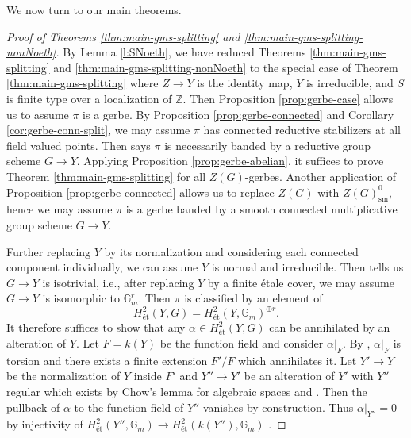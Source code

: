 \documentclass{amsart}
\theoremstyle{definition}
\newcommand{\bG}{\mathbb{G}}
\newcommand{\sm}{\mathrm{sm}}
\begin{document}
	We now turn to our main theorems.
	
	\begin{proof}[{Proof of Theorems \ref{thm:main-gms-splitting} and \ref{thm:main-gms-splitting-nonNoeth}}]
		By Lemma \ref{l:SNoeth}, we have reduced Theorems \ref{thm:main-gms-splitting} and \ref{thm:main-gms-splitting-nonNoeth} to the special case of Theorem \ref{thm:main-gms-splitting} where $Z\to Y$ is the identity map, $Y$ is irreducible, and $S$ is finite type over a localization of $\mathbb{Z}$. Then Proposition \ref{prop:gerbe-case} allows us to assume $\pi$ is a gerbe. By Proposition \ref{prop:gerbe-connected} and Corollary \ref{cor:gerbe-conn-split}, we may assume $\pi$ has connected reductive stabilizers at all field valued points. Then \cite[Ch.~V, sect.~3.2, p.~75]{Douai} says 
		$\pi$ is necessarily banded by a reductive group scheme $G\to Y$. Applying Proposition \ref{prop:gerbe-abelian}, it suffices to prove Theorem \ref{thm:main-gms-splitting} for all $Z(G)$-gerbes. Another application of Proposition \ref{prop:gerbe-connected} allows us to replace $Z(G)$ with $Z(G)^0_{\sm}$, hence we may assume $\pi$ is a gerbe banded by a smooth connected multiplicative group scheme $G\to Y$. 
		
		Further replacing $Y$ by its normalization and considering each connected component individually, we can assume $Y$ is normal and irreducible. Then \cite[Corollary B.3.6]{ConradReductive} tells us $G\to Y$ is isotrivial, i.e., after replacing $Y$ by a finite \'etale cover, we may assume $G\to Y$ is isomorphic to $\bG_m^r$. Then $\pi$ is classified by an element of 
		\[
		H^2_{\textrm{\'et}}(Y,G)= H^2_{\textrm{\'et}}(Y,\bG_m)^{\oplus r}.
		\]
		It therefore suffices to show that any $\alpha \in H^2_{\textrm{\'et}}(Y,G)$ can be annihilated by an alteration of $Y$. Let $F = k(Y)$ be the function field and consider $\alpha|_F$. By \cite[Cor. 1.3.6]{ColliotTheleneSkorobogatov}, $\alpha|_F$ is torsion and there exists a finite extension $F'/F$ which annihilates it. Let $Y' \to Y$ be the normalization of $Y$ inside $F'$ and $Y'' \to Y'$ be an alteration of $Y'$ with $Y''$ regular which exists by Chow's lemma for algebraic spaces \cite[IV Theorem 3.1]{Knutson1971} and \cite[Theorem 1.2.5]{Temkin2017}. Then the pullback of $\alpha$ to the function field of $Y''$ vanishes by construction. Thus $\alpha|_{Y''} = 0$ by injectivity of $H^2_{\textrm{\'et}}(Y'', \mathbb{G}_m) \to H^2_{\textrm{\'et}}(k(Y''), \mathbb{G}_m)$ \cite[Theorem 3.5.4]{ColliotTheleneSkorobogatov}. 
		
	\end{proof}
	
\end{document}
